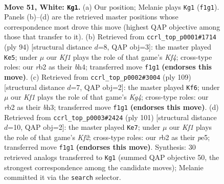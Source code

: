 \documentclass[11pt]{article}
\begin{document}
\clearpage

\begin{figure}[p]\centering
\begin{subfigure}{0.46\textwidth}\centering
\resizebox{\linewidth}{!}{%
\newchessgame
\chessboard[
  setfen={2k5/8/8/4p1p1/5p2/5B2/1r6/5K2 w - - 13 51},
  showmover=false,
  pgfstyle=straightmove, color=movearrow, markmove={f1-g1}
]}
\caption{}
\end{subfigure}\hfill
\begin{subfigure}{0.46\textwidth}\centering
\resizebox{\linewidth}{!}{%
\newchessgame
\chessboard[
  setfen={6k1/8/8/1p6/2p2K1b/2B5/8/8 w - - 0 48},
  showmover=false,
  pgfstyle=straightmove, color=movearrow, markmove={f4-e5}
]}
\caption{}
\end{subfigure}
\\[4pt]
\begin{subfigure}{0.46\textwidth}\centering
\resizebox{\linewidth}{!}{%
\newchessgame
\chessboard[
  setfen={8/8/1b1p4/1P1P2k1/2P5/5K1B/8/8 b - - 0 55},
  showmover=false,
  pgfstyle=straightmove, color=movearrow, markmove={g5-f6}
]}
\caption{}
\end{subfigure}\hfill
\begin{subfigure}{0.46\textwidth}\centering
\resizebox{\linewidth}{!}{%
\newchessgame
\chessboard[
  setfen={8/5k2/8/4P2P/5b2/1K3P2/6P1/8 b - - 2 51},
  showmover=false,
  pgfstyle=straightmove, color=movearrow, markmove={f7-e7}
]}
\caption{}
\end{subfigure}
\caption{\textbf{Move 51, White: \texttt{Kg1}.} (a) Our position; Melanie plays \texttt{Kg1} (\texttt{f1g1}). Panels (b)--(d) are the retrieved master positions whose correspondence most drove this move (highest QAP objective among those that transfer to it). (b) Retrieved from \texttt{ccrl\_top\_p0001\#1714} (ply 94) [structural distance $d$=8, QAP obj=3]: the master played \texttt{Ke5}; under $\mu$ our \emph{Kf1} plays the role of that game's \emph{Kf4}; cross-type roles: our \emph{r}b2 as their \emph{b}h4; transferred move \texttt{f1g1} \textbf{(endorses this move)}. (c) Retrieved from \texttt{ccrl\_top\_p0002\#3004} (ply 109) [structural distance $d$=7, QAP obj=2]: the master played \texttt{Kf6}; under $\mu$ our \emph{Kf1} plays the role of that game's \emph{Kg4}; cross-type roles: our \emph{r}b2 as their \emph{b}h3; transferred move \texttt{f1g1} \textbf{(endorses this move)}. (d) Retrieved from \texttt{ccrl\_top\_p0003\#2424} (ply 101) [structural distance $d$=10, QAP obj=2]: the master played \texttt{Ke7}; under $\mu$ our \emph{Kf1} plays the role of that game's \emph{Kf2}; cross-type roles: our \emph{r}b2 as their \emph{p}e5; transferred move \texttt{f1g1} \textbf{(endorses this move)}. Synthesis: 30 retrieved analogs transferred to \texttt{Kg1} (summed QAP objective 50, the strongest correspondence among the candidate moves); Melanie committed it via the \texttt{search} selector.}
\label{fig:thought-m100}
\end{figure}
\end{document}
